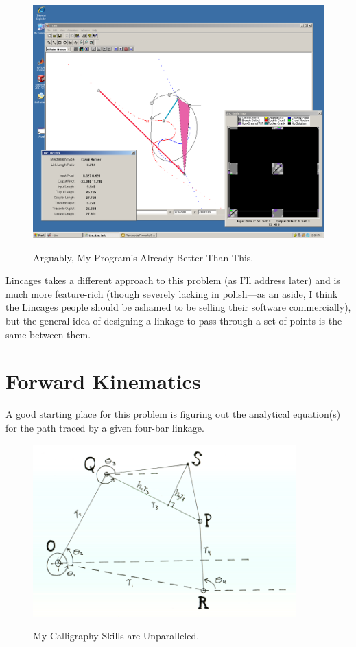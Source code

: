 \documentclass[12pt, letterpaper]{article}
\begin{document}
\begin{figure}[H]
\centering
\caption{Arguably, My Program's Already Better Than This.}
\includegraphics[width=4.5in]{lincages}
\label{fig:lincages}
\end{figure}

Lincages takes a different approach to this problem (as I'll address later) and is much more feature-rich (though severely lacking in polish---as an aside, I think the Lincages people should be ashamed to be selling their software commercially), but the general idea of designing a linkage to pass through a set of points is the same between them.

\section*{Forward Kinematics}

A good starting place for this problem is figuring out the analytical equation(s) for the path traced by a given four-bar linkage.

\begin{figure}[H]
\centering
\caption{My Calligraphy Skills are Unparalleled.}
\includegraphics[width=4.0in]{fourbar}
\label{fig:fourbar}
\end{figure}
\end{document}
